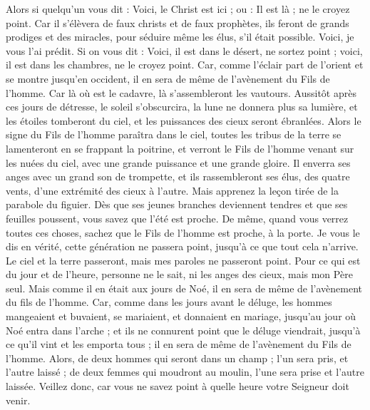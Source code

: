 \begin{multicols}{2}
Alors si quelqu'un vous dit : Voici, le Christ est ici ; ou : Il est là ; ne le croyez point.
Car il s'élèvera de faux christs et de faux prophètes, ils feront de grands prodiges et des miracles, pour séduire même les élus, s'il était possible.
Voici, je vous l'ai prédit.
Si on vous dit : Voici, il est dans le désert, ne sortez point ; voici, il est dans les chambres, ne le croyez point.
Car, comme l'éclair part de l'orient et se montre jusqu'en occident, il en sera de même de l'avènement du Fils de l'homme.
Car là où est le cadavre, là s'assembleront les vautours.
Aussitôt après ces jours de détresse, le soleil s'obscurcira, la lune ne donnera plus sa lumière, et les étoiles tomberont du ciel, et les puissances des cieux seront ébranlées.
Alors le signe du Fils de l'homme paraîtra dans le ciel, toutes les tribus de la terre se lamenteront en se frappant la poitrine, et verront le Fils de l'homme venant sur les nuées du ciel, avec une grande puissance et une grande gloire.
Il enverra ses anges avec un grand son de trompette, et ils rassembleront ses élus, des quatre vents, d'une extrémité des cieux à l'autre.
Mais apprenez la leçon tirée de la parabole du figuier. Dès que ses jeunes branches deviennent tendres et que ses feuilles poussent, vous savez que l'été est proche.
De même, quand vous verrez toutes ces choses, sachez que le Fils de l'homme est proche, à la porte.
Je vous le dis en vérité, cette génération ne passera point, jusqu'à ce que tout cela n'arrive.
Le ciel et la terre passeront, mais mes paroles ne passeront point.
Pour ce qui est du jour et de l'heure, personne ne le sait, ni les anges des cieux, mais mon Père seul.
Mais comme il en était aux jours de Noé, il en sera de même de l'avènement du fils de l'homme.
Car, comme dans les jours avant le déluge, les hommes mangeaient et buvaient, se mariaient, et donnaient en mariage, jusqu'au jour où Noé entra dans l'arche ;
et ils ne connurent point que le déluge viendrait, jusqu'à ce qu'il vint et les emporta tous ; il en sera de même de l'avènement du Fils de l'homme.
Alors, de deux hommes qui seront dans un champ ; l'un sera pris, et l'autre laissé ;
de deux femmes qui moudront au moulin, l'une sera prise et l'autre laissée.
Veillez donc, car vous ne savez point à quelle heure votre Seigneur doit venir.

\end{multicols}
